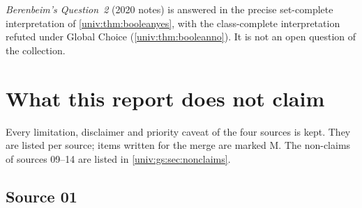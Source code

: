 \documentclass[11pt,letterpaper]{article}
\numberwithin{equation}{section}
\theoremstyle{definition}
\theoremstyle{remark}
\begin{document}
\emph{Berenbeim's Question~2} (2020 notes) is answered in the precise
set-complete interpretation of \cref{univ:thm:booleanyes}, with the
class-complete interpretation refuted under Global Choice
(\cref{univ:thm:booleanno}). It is not an open question of the collection.

\section{What this report does not claim}\label{univ:sec:nonclaims}

Every limitation, disclaimer and priority caveat of the four sources is kept.
They are listed per source; items written for the merge are marked M. The
non-claims of sources 09--14 are listed in \cref{univ:gs:sec:nonclaims}.

\subsection*{Source 01}
\end{document}
